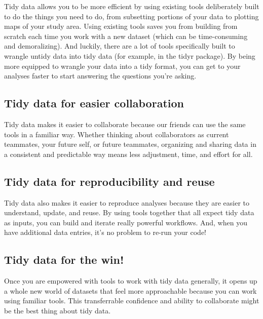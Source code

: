 \documentclass[
  letterpaper,
  DIV=11,
  numbers=noendperiod]{scrreprt}
\begin{document}
Tidy data allows you to be more efficient by using existing tools
deliberately built to do the things you need to do, from subsetting
portions of your data to plotting maps of your study area. Using
existing tools saves you from building from scratch each time you work
with a new dataset (which can be time-consuming and demoralizing). And
luckily, there are a lot of tools specifically built to wrangle untidy
data into tidy data (for example, in the tidyr package). By being more
equipped to wrangle your data into a tidy format, you can get to your
analyses faster to start answering the questions you're asking.

\hypertarget{tidy-data-for-easier-collaboration}{%
\subsection{Tidy data for easier
collaboration}\label{tidy-data-for-easier-collaboration}}

Tidy data makes it easier to collaborate because our friends can use the
same tools in a familiar way. Whether thinking about collaborators as
current teammates, your future self, or future teammates, organizing and
sharing data in a consistent and predictable way means less adjustment,
time, and effort for all.

\hypertarget{tidy-data-for-reproducibility-and-reuse}{%
\subsection{Tidy data for reproducibility and
reuse}\label{tidy-data-for-reproducibility-and-reuse}}

Tidy data also makes it easier to reproduce analyses because they are
easier to understand, update, and reuse. By using tools together that
all expect tidy data as inputs, you can build and iterate really
powerful workflows. And, when you have additional data entries, it's no
problem to re-run your code!

\hypertarget{tidy-data-for-the-win}{%
\subsection{Tidy data for the win!}\label{tidy-data-for-the-win}}

Once you are empowered with tools to work with tidy data generally, it
opens up a whole new world of datasets that feel more approachable
because you can work using familiar tools. This transferrable confidence
and ability to collaborate might be the best thing about tidy data.
\end{document}

